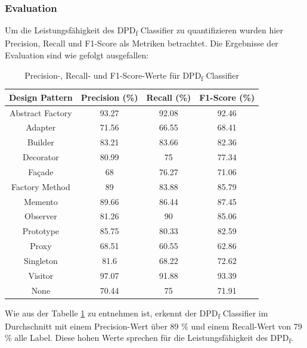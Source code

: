 \documentclass[conference]{IEEEtran}
\begin{document}
\subsubsection*{Evaluation}

Um die Leistungsfähigkeit des DPD\textsubscript{f} Classifier zu quantifizieren wurden hier Precision, Recall und F1-Score als Metriken betrachtet. 
Die Ergebnisse der Evaluation sind wie gefolgt ausgefallen:

\begin{table}[h]
    \caption{Precision-, Recall- und F1-Score-Werte für DPD\textsubscript{f} Classifier}
    \label{table:7}
    \begin{tabular}{|c|c|c|c|}
        \hline
        Design Pattern &  Precision (\%) & Recall (\%) & F1-Score (\%)\\
        \hline
        Abstract Factory & 93.27 & 92.08 & 92.46\\
        \hline
        Adapter & 71.56 & 66.55 & 68.41\\
        \hline
        Builder & 83.21 & 83.66 & 82.36\\
        \hline
        Decorator & 80.99 & 75 & 77.34\\
        \hline
        Façade & 68 & 76.27 & 71.06\\
        \hline
        Factory Method & 89 & 83.88 & 85.79\\
        \hline
        Memento & 89.66 & 86.44 & 87.45\\
        \hline
        Observer & 81.26 & 90 & 85.06\\
        \hline
        Prototype & 85.75 & 80.33 & 82.59\\
        \hline
        Proxy & 68.51 & 60.55 & 62.86\\
        \hline
        Singleton & 81.6 & 68.22 & 72.62\\
        \hline
        Visitor & 97.07 & 91.88 & 93.39\\
        \hline
        None & 70.44 & 75 & 71.91\\
        \hline
    \end{tabular}
\end{table}

Wie aus der Tabelle \ref{table:7} zu entnehmen ist, erkennt der DPD\textsubscript{f} Classifier im Durchschnitt mit einem Precision-Wert über 89 \% und einem Recall-Wert von 79 \% alle Label.
Diese hohen Werte sprechen für die Leistungsfähigkeit des DPD\textsubscript{f}.
\end{document}
